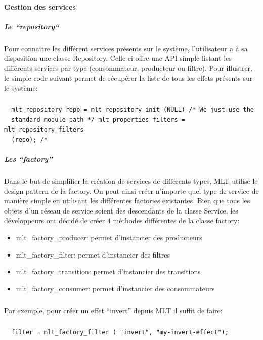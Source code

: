 \paragraph{Gestion des services}

\subparagraph{Le ``repository``}

Pour connaitre les différent services présents sur le système,
l'utilisateur a à sa disposition une classe Repository. Celle-ci offre
une API simple listant les différents services par type
(consommateur, producteur ou filtre).  Pour illustrer, le simple code
suivant permet de récupérer la liste de tous les effets présents sur
le système:

\subparagraph{}

\begin{lstlisting}
  mlt_repository repo = mlt_repository_init (NULL) /* We just use the
  standard module path */ mlt_properties filters = mlt_repository_filters
  (repo); /*
\end{lstlisting}

\subparagraph{Les ``factory''} Dans le but de simplifier la création
de services de différents types, MLT utilise le design pattern de la
factory. On peut ainsi créer n'importe quel type de service de manière
simple en utilisant les différentes factories existantes. Bien que
tous les objets d'un réseau de service soient des descendants de la
classe Service, les développeurs ont décidé de créer 4 méthodes
différentes de la classe factory:

\begin{itemize}

  \item {mlt\_factory\_producer: permet d'instancier des producteurs}

  \item {mlt\_factory\_filter: permet d'instancier des filtres}

  \item {mlt\_factory\_transition: permet d'instancier des transitions}

  \item {mlt\_factory\_consumer: permet d'instancier des consommateurs}

\end{itemize}

\subparagraph{}

Par exemple, pour créer un effet ``invert'' depuis MLT il suffit
de faire:

\subparagraph{}

\begin{lstlisting}
  filter = mlt_factory_filter ( "invert", "my-invert-effect");
\end{lstlisting}

